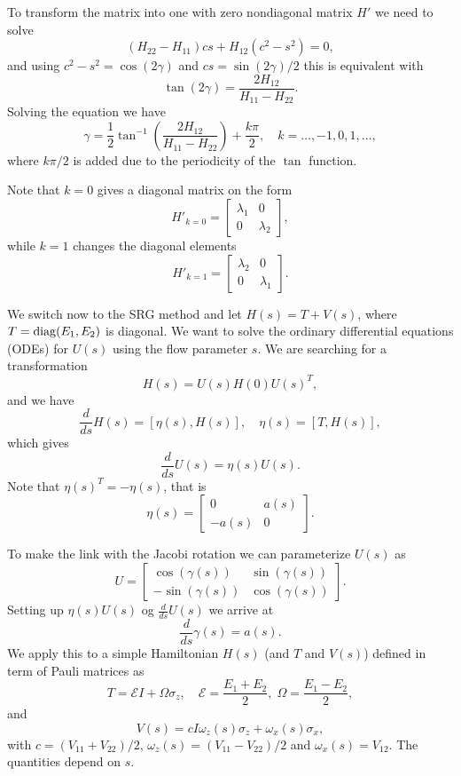 To transform the matrix into one with zero  nondiagonal matrix $H'$ we need to solve
\[ 
(H_{22} - H_{11})cs + H_{12}(c^2 - s^2) = 0, 
\]
and using $c^2-s^2 = \cos(2\gamma)$ and $cs = \sin(2\gamma)/2$
this is equivalent with 
\[ \tan(2\gamma) = \frac{2 H_{12}}{H_{11}-H_{22}}. \]
Solving the equation we have
\begin{equation} 
\gamma = \frac{1}{2} \tan^{-1} \left( \frac{2H_{12}}{H_{11}-H_{22}}
\right) + \frac{k\pi}{2}, \quad k=\ldots,-1,0,1,\ldots, \label{eq:0} 
\end{equation}
where $k\pi/2$ is added due to the periodicity of the $\tan$ function.

Note that  $k=0$ gives a diagonal matrix on the form
\begin{equation} 
H'_{k=0} = \begin{bmatrix} \lambda_1 & 0 \\ 0 & \lambda_2 \end{bmatrix},
\label{eq:1} 
\end{equation}
while  $k=1$ changes the diagonal elements  
\begin{equation} 
H'_{k=1} = \begin{bmatrix} \lambda_2 & 0 \\ 0 & \lambda_1 \end{bmatrix}.
\label{eq:2}
\end{equation}

We switch now to the SRG method and 
let $H(s) = T + V(s)$, where $T= \operatorname{diag}(E_1,E_2)$ is diagonal. We want to solve the ordinary differential equations (ODEs) 
for $U(s)$ using the flow parameter $s$. 
We are searching for a transformation 
\[ 
H(s) = U(s)H(0)U(s)^T, 
\]
and we have
\[ 
\frac{d}{ds} H(s) = [\eta(s),H(s)],  \quad \eta(s) = [T,H(s)], 
\]
which gives
\[ 
\frac{d}{ds} U(s) = \eta(s) U(s). 
\]
Note that $\eta(s)^T = -\eta(s)$, that is
\[ 
\eta(s) = \begin{bmatrix} 0 & a(s) \\ -a(s) & 0 \end{bmatrix}. 
\]

To make the link with the Jacobi rotation
we can parameterize $U(s)$ as
\[ 
U = \begin{bmatrix} \cos(\gamma(s)) & \sin(\gamma(s)) \\ -\sin(\gamma(s)) & \cos(\gamma(s)) \end{bmatrix}. 
\]
Setting up $\eta(s)U(s)$ og $\frac{d}{ds} U(s)$ we arrive at 
\[ 
\frac{d}{ds} \gamma(s) = a(s). 
\]
We apply this to a simple Hamiltonian $H(s)$ (and $T$ and $V(s)$)  defined in term of Pauli matrices  as
\[ 
T = \mathcal{E} I + \Omega \sigma_z, \quad \mathcal{E} = \frac{E_1+ E_2}{2}, \; \Omega = \frac{E_1-E_2}{2}, 
\]
and
\[ 
V(s) = c I \omega_z(s)\sigma_z + \omega_x(s)\sigma_x, 
\]
with $c = (V_{11}+V_{22})/2$, $\omega_z(s) = (V_{11}-V_{22})/2$ and $\omega_x(s) = V_12$. The quantities depend on
$s$. 

